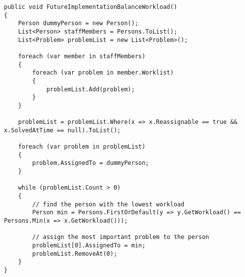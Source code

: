 \begin{lstlisting}[style=sourceCode, caption=\myCaption{A possible future implementation of the \me{BalanceWorkload} algorithm.}, label=lst:futureimplementationbalanceworkload]
public void FutureImplementationBalanceWorkload()
{
    Person dummyPerson = new Person();
    List<Person> staffMembers = Persons.ToList();
    List<Problem> problemList = new List<Problem>();

    foreach (var member in staffMembers)
    {
        foreach (var problem in member.Worklist)
        {
            problemList.Add(problem);
        }
    }

    problemList = problemList.Where(x => x.Reassignable == true && x.SolvedAtTime == null).ToList();

    foreach (var problem in problemList)
    {
        problem.AssignedTo = dummyPerson;
    }

    while (problemList.Count > 0)
    {
        // find the person with the lowest workload
        Person min = Persons.FirstOrDefault(y => y.GetWorkload() == Persons.Min(x => x.GetWorkload()));

        // assign the most important problem to the person
        problemList[0].AssignedTo = min;
        problemList.RemoveAt(0);
    }
}
\end{lstlisting}
